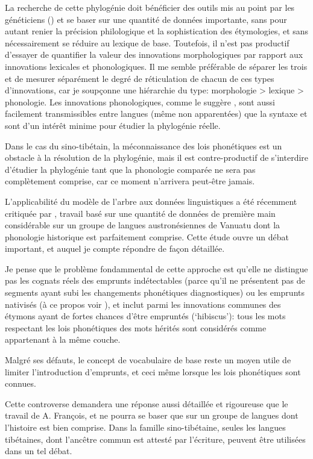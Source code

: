 \documentclass[oldfontcommands,oneside,a4paper,11pt]{memoir}
\begin{document}
	La recherche de cette phylogénie doit bénéficier des outils mis au point par les généticiens (\citealt{gray03ie}) et se baser sur une quantité de données importante, sans pour autant renier la précision philologique et la sophistication des étymologies, et sans nécessairement se réduire au lexique de base. Toutefois, il n'est pas productif d'essayer de quantifier la valeur des innovations morphologiques par rapport aux innovations lexicales et phonologiques. Il me semble préférable de séparer les trois et de mesurer séparément le degré de réticulation de chacun de ces types d'innovations, car je soupçonne une hiérarchie du type: morphologie > lexique > phonologie. Les innovations phonologiques, comme le suggère \citet{sagart04an-tk}, sont aussi facilement transmissibles entre langues (même non apparentées) que la syntaxe et sont d'un intérêt minime pour étudier la phylogénie réelle.
	
	Dans le cas du sino-tibétain, la méconnaissance des lois phonétiques est un obstacle à la résolution de la phylogénie, mais il est contre-productif de s'interdire d'étudier la phylogénie tant que la phonologie comparée ne sera pas complètement comprise, car ce moment n'arrivera peut-être jamais.
	
L'applicabilité du modèle de l'arbre aux données linguistiques a été récemment critiquée par \citet{francois14tree}, travail  basé sur une quantité de données de première main considérable sur un groupe de langues austronésiennes de Vanuatu dont la phonologie historique est parfaitement comprise. Cette étude ouvre un débat important, et auquel je compte répondre de façon détaillée. 

Je pense que le problème fondammental de cette approche est qu'elle ne distingue pas les cognats réels des emprunts indétectables (parce qu'il ne présentent pas de segments ayant subi les changements phonétiques diagnostiques) ou les emprunts nativisés (à ce propos voir \citealt{aikio06nativization}), et   inclut parmi les innovations communes des étymons ayant de fortes chances d'être empruntés (`hibiscus'): tous les mots respectant les lois phonétiques des mots hérités sont considérés comme appartenant à la même couche. 

Malgré ses défauts, le concept de vocabulaire de base reste un moyen utile de limiter l'introduction d'emprunts, et ceci même lorsque les lois phonétiques sont connues.

Cette controverse demandera une réponse aussi détaillée et rigoureuse que le travail de A. François, et ne pourra se baser que sur un groupe de langues dont l'histoire est bien comprise. Dans la famille sino-tibétaine, seules les langues tibétaines, dont l'ancêtre commun est attesté par l'écriture, peuvent être utilisées dans un tel débat.
	
\end{document}
